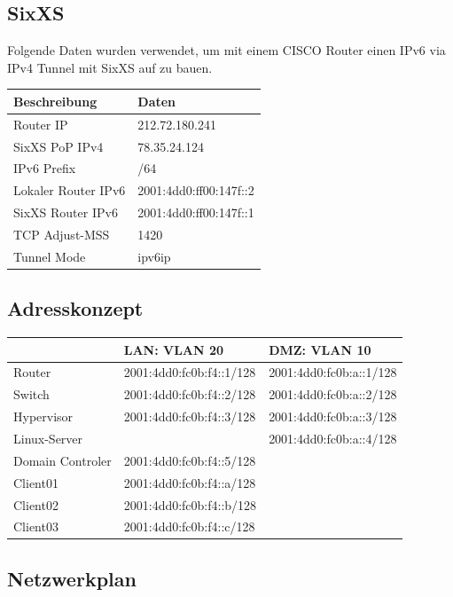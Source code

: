 \subsection{SixXS}

Folgende Daten wurden verwendet, um mit einem CISCO Router einen IPv6 via IPv4 Tunnel mit SixXS auf zu bauen.


\begin{tabular}{|l|l|}
\hline
Beschreibung			& Daten						\\
\hline
Router IP				& 212.72.180.241		 	\\
SixXS PoP IPv4			& 78.35.24.124			 	\\
IPv6 Prefix				& /64					 	\\	
Lokaler Router	IPv6	& 2001:4dd0:ff00:147f::2 	\\
SixXS Router IPv6 		& 2001:4dd0:ff00:147f::1	\\
TCP Adjust-MSS			& 1420						\\
Tunnel Mode				& ipv6ip					\\
\hline
\end{tabular}

\subsection{Adresskonzept}

\begin{tabular}{|l|l|l|}
\hline
						& LAN: VLAN 20					& DMZ: VLAN 10 \\
\hline
Router					& 2001:4dd0:fc0b:f4::1/128		& 2001:4dd0:fc0b:a::1/128 \\
Switch					& 2001:4dd0:fc0b:f4::2/128		& 2001:4dd0:fc0b:a::2/128 \\
Hypervisor				& 2001:4dd0:fc0b:f4::3/128		& 2001:4dd0:fc0b:a::3/128 \\	
Linux-Server			&								& 2001:4dd0:fc0b:a::4/128 \\
Domain Controler 		& 2001:4dd0:fc0b:f4::5/128		& \\
Client01				& 2001:4dd0:fc0b:f4::a/128		& \\
Client02				& 2001:4dd0:fc0b:f4::b/128		& \\
Client03				& 2001:4dd0:fc0b:f4::c/128		& \\
\hline
\end{tabular}

\subsection{Netzwerkplan}

